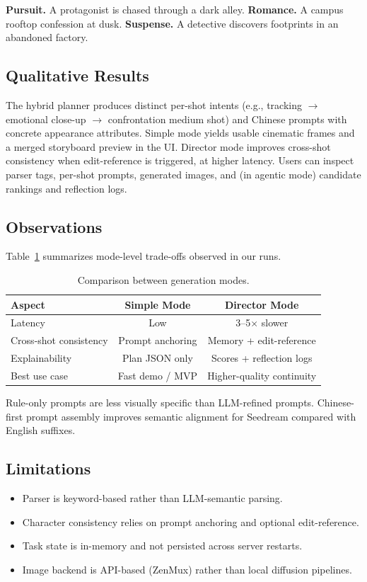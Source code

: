 \documentclass{article}
\begin{document}
\textbf{Pursuit.} A protagonist is chased through a dark alley.
\textbf{Romance.} A campus rooftop confession at dusk.
\textbf{Suspense.} A detective discovers footprints in an abandoned factory.

\subsection{Qualitative Results}
The hybrid planner produces distinct per-shot intents (e.g., tracking $\rightarrow$ emotional close-up $\rightarrow$ confrontation medium shot) and Chinese prompts with concrete appearance attributes.
Simple mode yields usable cinematic frames and a merged storyboard preview in the UI.
Director mode improves cross-shot consistency when edit-reference is triggered, at higher latency.
Users can inspect parser tags, per-shot prompts, generated images, and (in agentic mode) candidate rankings and reflection logs.

\subsection{Observations}
Table~\ref{tab:compare} summarizes mode-level trade-offs observed in our runs.

\begin{table}[t]
\centering
\small
\begin{tabular}{@{}lcc@{}}
\toprule
\textbf{Aspect} & \textbf{Simple Mode} & \textbf{Director Mode} \\
\midrule
Latency & Low & 3--5$\times$ slower \\
Cross-shot consistency & Prompt anchoring & Memory + edit-reference \\
Explainability & Plan JSON only & Scores + reflection logs \\
Best use case & Fast demo / MVP & Higher-quality continuity \\
\bottomrule
\end{tabular}
\caption{Comparison between generation modes.}
\label{tab:compare}
\end{table}

Rule-only prompts are less visually specific than LLM-refined prompts.
Chinese-first prompt assembly improves semantic alignment for Seedream compared with English suffixes.

\subsection{Limitations}
\begin{itemize}[leftmargin=*, itemsep=2pt]
  \item Parser is keyword-based rather than LLM-semantic parsing.
  \item Character consistency relies on prompt anchoring and optional edit-reference.
  \item Task state is in-memory and not persisted across server restarts.
  \item Image backend is API-based (ZenMux) rather than local diffusion pipelines.
\end{itemize}
\end{document}
